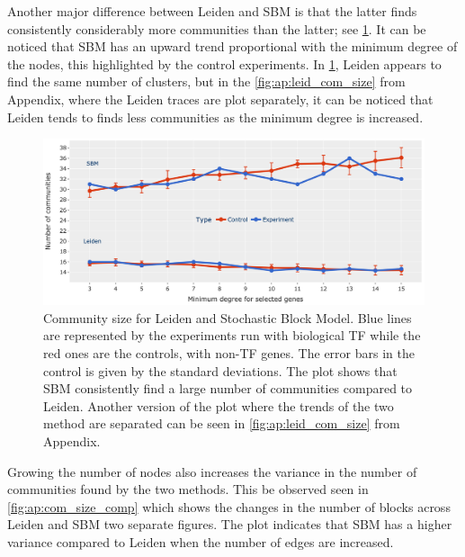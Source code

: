 Another major difference between Leiden and SBM is that the latter finds consistently considerably more communities than the latter; see \cref{fig:N_I:comp_size_com_det}. It can be noticed that SBM has an upward trend proportional with the minimum degree of the nodes, this highlighted by the control experiments. In \cref{fig:N_I:comp_size_com_det}, Leiden appears to find the same number of clusters, but in the \cref{fig:ap:leid_com_size} from Appendix, where the Leiden traces are plot separately, it can be noticed that Leiden tends to finds less communities as the minimum degree is increased. 

\begin{figure}[!htb]   
    \centering
    \includegraphics[width=1.0\textwidth,keepaspectratio]{Sections/Network_I/Resources/selective_pruning/com_comp/sbm_Leiden_combNum.png}
      \caption[Leiden vs SBM: Number of communities found]{Community size for Leiden and Stochastic Block Model. Blue lines are represented by the experiments run with biological TF while the red ones are the controls, with non-TF genes. The error bars in the control is given by the standard deviations. The plot shows that SBM consistently find a large number of communities compared to Leiden. Another version of the plot where the trends of the two method are separated can be seen in \cref{fig:ap:leid_com_size} from Appendix.}
    \label{fig:N_I:comp_size_com_det}
\end{figure}

Growing the number of nodes also increases the variance in the number of communities found by the two methods. This be observed seen in \cref{fig:ap:com_size_comp} which shows the changes in the number of blocks across Leiden and SBM two separate figures. The plot indicates that SBM has a higher variance compared to Leiden when the number of edges are increased.


